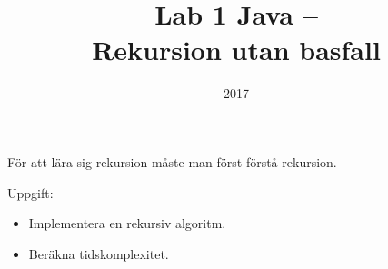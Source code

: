 \documentclass{article}
\title{Lab 1 Java -- \\Rekursion utan basfall}
\date{2017}
\begin{document}
\maketitle

För att lära sig rekursion måste man först förstå rekursion.

Uppgift:
\begin{itemize}
	\item Implementera en rekursiv algoritm.
	\item Beräkna tidskomplexitet.
\end{itemize}
\end{document}
